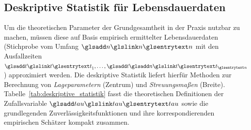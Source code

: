 \subsection{Deskriptive Statistik für Lebensdauerdaten} \label{subsec:stat1}
Um die theoretischen Parameter der Grundgesamtheit in der Praxis nutzbar zu machen, müssen diese auf Basis empirisch ermittelter Lebensdauerdaten (Stichprobe vom Umfang $\sym{n}$ mit den Ausfallzeiten $\sym{t}_{1}, \dots, \symsub{t}{n}$) approximiert werden.
Die deskriptive Statistik liefert hierfür Methoden zur Berechnung von \textit{Lageparametern} (Zentrum) und \textit{Streuungsmaßen} (Breite).
Tabelle~\ref{tab:deskriptive_statistik} fasst die theoretischen Definitionen der Zufallsvariable $\sym{tau}$ sowie die grundlegenden Zuverlässigkeitsfunktionen und ihre korrespondierenden empirischen Schätzer kompakt zusammen.

